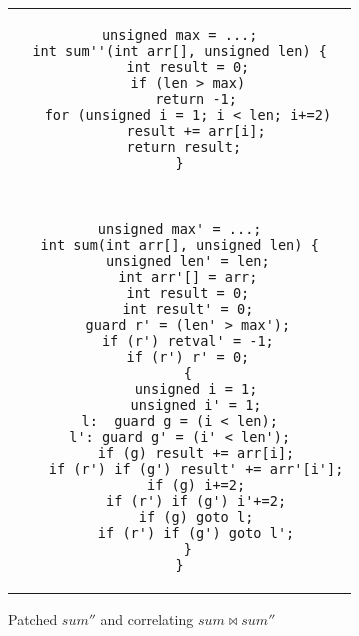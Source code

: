 \begin{figure}
\centering
\begin{tabular}{c}
\begin{lstlisting}
unsigned max = ...;
int sum''(int arr[], unsigned len) {
  int result = 0;
  if (len > max)
    return -1;
  for (unsigned i = 1; i < len; i+=2)
    result += arr[i];
 return result;
}
\end{lstlisting}
\\
\\ \hline
\\
\begin{lstlisting}
unsigned max' = ...;
int sum(int arr[], unsigned len) {
  unsigned len' = len;
  int arr'[] = arr;
  int result = 0;
  int result' = 0;
  guard r' = (len' > max');
  if (r') retval' = -1;
  if (r') r' = 0;
  {
    unsigned i = 1;
    unsigned i' = 1;
l:  guard g = (i < len);
l': guard g' = (i' < len');
    if (g) result += arr[i];
    if (r') if (g') result' += arr'[i'];
    if (g) i+=2;
    if (r') if (g') i'+=2;
    if (g) goto l;
    if (r') if (g') goto l';
  }
}
\end{lstlisting}
\end{tabular}
\caption{Patched $sum''$ and correlating $sum \bowtie sum''$}
\end{figure} 